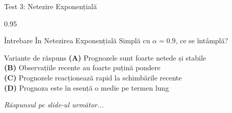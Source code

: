 \documentclass[9pt, aspectratio=169, t]{beamer}
\begin{document}
\begin{frame}{Test 3: Netezire Exponențială}
    \begin{cminipage}{0.95\textwidth}
    \begin{alertblock}{Întrebare}
        În Netezirea Exponențială Simplă cu $\alpha = 0.9$, ce se întâmplă?
    \end{alertblock}

    \vspace{0.4cm}

    \begin{block}{Variante de răspuns}
    \textcolor{MainBlue}{\textbf{(A)}} Prognozele sunt foarte netede și stabile\\[3pt]
    \textcolor{MainBlue}{\textbf{(B)}} Observațiile recente au foarte puțină pondere\\[3pt]
    \textcolor{MainBlue}{\textbf{(C)}} Prognozele reacționează rapid la schimbările recente\\[3pt]
    \textcolor{MainBlue}{\textbf{(D)}} Prognoza este în esență o medie pe termen lung
    \end{block}
    \vspace{0.5cm}

    \begin{center}
        \textit{Răspunsul pe slide-ul următor...}
    \end{center}
    \end{cminipage}
\end{frame}
\end{document}
